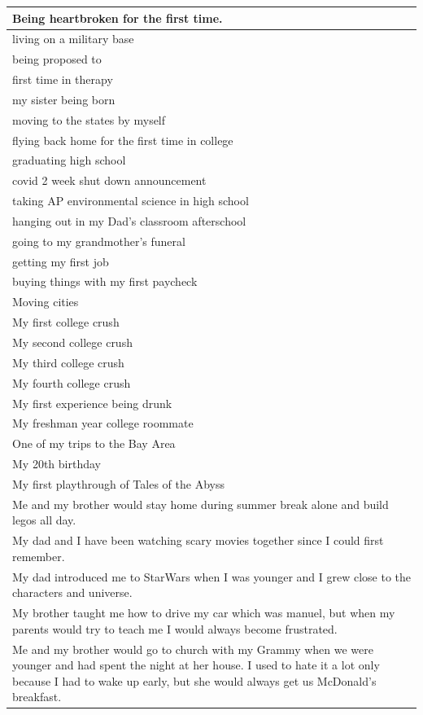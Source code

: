 \documentclass[
  .7em,
  letterpaper,
  DIV=11,
  numbers=noendperiod]{scrartcl}
\begin{document}
\begin{table}
\begin{tabular}{l}
\hline
Being heartbroken for the first time.\\
\hline
living on a military base\\
\hline
being proposed to\\
\hline
first time in therapy\\
\hline
my sister being born\\
\hline
moving to the states by myself\\
\hline
flying back home for the first time in college\\
\hline
graduating high school\\
\hline
covid 2 week shut down announcement\\
\hline
taking AP environmental science in high school\\
\hline
hanging out in my Dad’s classroom afterschool\\
\hline
going to my grandmother’s funeral\\
\hline
getting my first job\\
\hline
buying things with my first paycheck\\
\hline
Moving cities\\
\hline
My first college crush\\
\hline
My second college crush\\
\hline
My third college crush\\
\hline
My fourth college crush\\
\hline
My first experience being drunk\\
\hline
My freshman year college roommate\\
\hline
One of my trips to the Bay Area\\
\hline
My 20th birthday\\
\hline
My first playthrough of Tales of the Abyss\\
\hline
Me and my brother would stay home during summer break alone and build legos all day.\\
\hline
My dad and I have been watching scary movies together since I could first remember.\\
\hline
My dad introduced me to StarWars when I was younger and I grew close to the characters and universe.\\
\hline
My brother taught me how to drive my car which was manuel, but when my parents would try to teach me I would always become frustrated.\\
\hline
Me and my brother would go to church with my Grammy when we were younger and had spent the night at her house. I used to hate it a lot only because I had to wake up early, but she would always get us McDonald's breakfast.\\

\end{tabular}
\end{table}
\end{document}
